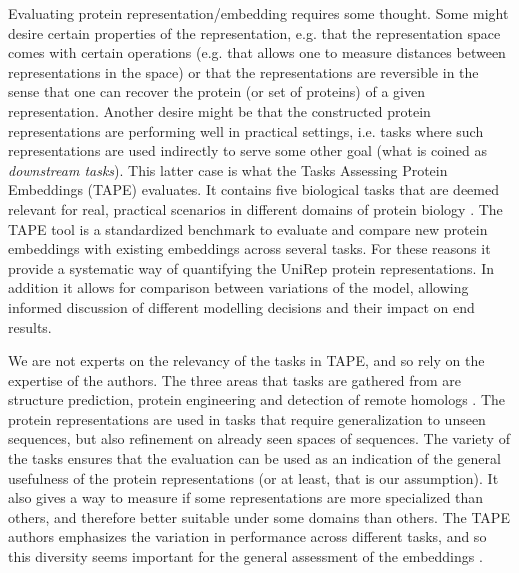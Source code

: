 \documentclass[a4paper,12pt]{article}
\begin{document}
Evaluating protein representation/embedding requires some thought. Some might desire certain properties of the representation, e.g. that the representation space comes with certain operations (e.g. that allows one to measure distances between representations in the space) or that the representations are reversible in the sense that one can recover the protein (or set of proteins) of a given representation. Another desire might be that the constructed protein representations are performing well in practical settings, i.e. tasks where such representations are used indirectly to serve some other goal (what is coined as \textit{downstream tasks}). This latter case is what the Tasks Assessing Protein Embeddings (TAPE) evaluates. It contains five biological tasks that are deemed relevant for real, practical scenarios in different domains of protein biology \cite{tape2019}. The TAPE tool is a standardized benchmark to evaluate and compare new protein embeddings with existing embeddings across several tasks. For these reasons it provide a systematic way of quantifying the UniRep protein representations. In addition it allows for comparison between variations of the model, allowing informed discussion of different modelling decisions and their impact on end results.

We are not experts on the relevancy of the tasks in TAPE, and so rely on the expertise of the authors. The three areas that tasks are gathered from are structure prediction, protein engineering and detection of remote homologs \cite{tape2019}. The protein representations are used in tasks that require generalization to unseen sequences, but also refinement on already seen spaces of sequences. The variety of the tasks ensures that the evaluation can be used as an indication of the general usefulness of the protein representations (or at least, that is our assumption). It also gives a way to measure if some representations are more specialized than others, and therefore better suitable under some domains than others. The TAPE authors emphasizes the variation in performance across different tasks, and so this diversity seems important for the general assessment of the embeddings \cite{tape2019}.
\end{document}
